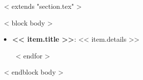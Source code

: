 ~< extends "section.tex" >~

~< block body >~

  \begin{itemize}
  ~< for item in items >~
  
     \item
        \begin{small}
        \textbf{<< item.title >>}: << item.details >>
        \end{small}
  ~< endfor >~
  \end{itemize}
~< endblock body >~
